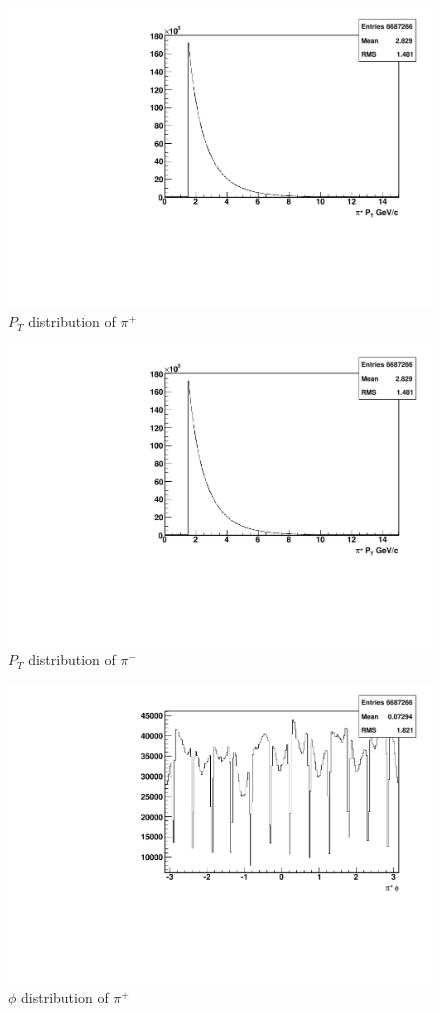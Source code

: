\documentclass[letterpaper, abstract = on,listof=totoc, bibliography=totoc]{scrreprt}
\begin{document}
\FloatBarrier
\begin{figure}
\begin{center}
\includegraphics[width = .8\textwidth]{hPosPt}
\caption[$P_{T}$ distribution of $\pi^+$]{$P_{T}$ distribution of $\pi^+$}
\label{fig:posPt}
\end{center}
\end{figure}

\begin{figure}
\begin{center}
\includegraphics[width = .8\textwidth]{hNegPt}
\caption[$P_{T}$ distribution of $\pi^-$]{$P_{T}$ distribution of $\pi^-$}
\label{fig:negpt}
\end{center}
\end{figure}

\begin{figure}
\begin{center}
\includegraphics[width = .8\textwidth]{hPosPhi}
\caption[$\phi$ distribution of $\pi^+$]{$\phi$ distribution of $\pi^+$}
\label{fig:posphi}
\end{center}
\end{figure}
\end{document}
